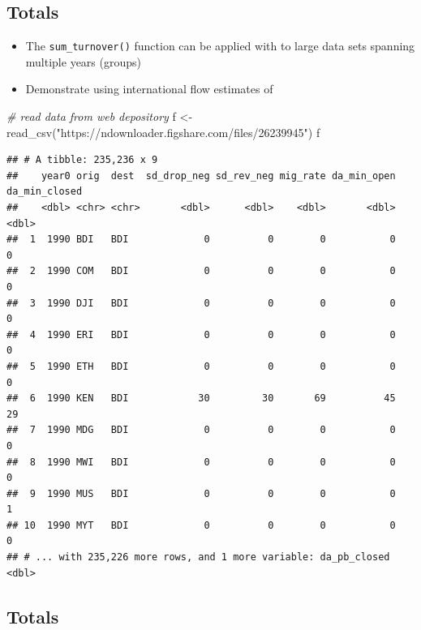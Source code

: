 \documentclass[
]{book}
\newenvironment{Shaded}{\begin{snugshade}}{\end{snugshade}}
\newcommand{\CommentTok}[1]{\textcolor[rgb]{0.56,0.35,0.01}{\textit{#1}}}
\newcommand{\FunctionTok}[1]{\textcolor[rgb]{0.00,0.00,0.00}{#1}}
\newcommand{\NormalTok}[1]{#1}
\newcommand{\OtherTok}[1]{\textcolor[rgb]{0.56,0.35,0.01}{#1}}
\newcommand{\StringTok}[1]{\textcolor[rgb]{0.31,0.60,0.02}{#1}}
\providecommand{\tightlist}{%
  \setlength{\itemsep}{0pt}\setlength{\parskip}{0pt}}
\begin{document}
\hypertarget{totals-2}{%
\subsection{Totals}\label{totals-2}}

\begin{itemize}
\tightlist
\item
  The \texttt{sum\_turnover()} function can be applied with to large data sets spanning multiple years (groups)
\item
  Demonstrate using international flow estimates of \citet{Abel2019}
\end{itemize}

\begin{Shaded}
\begin{Highlighting}[]
\CommentTok{\# read data from web depository}
\NormalTok{f }\OtherTok{\textless{}{-}} \FunctionTok{read\_csv}\NormalTok{(}\StringTok{"https://ndownloader.figshare.com/files/26239945"}\NormalTok{)}
\NormalTok{f}
\end{Highlighting}
\end{Shaded}

\begin{verbatim}
## # A tibble: 235,236 x 9
##    year0 orig  dest  sd_drop_neg sd_rev_neg mig_rate da_min_open da_min_closed
##    <dbl> <chr> <chr>       <dbl>      <dbl>    <dbl>       <dbl>         <dbl>
##  1  1990 BDI   BDI             0          0        0           0             0
##  2  1990 COM   BDI             0          0        0           0             0
##  3  1990 DJI   BDI             0          0        0           0             0
##  4  1990 ERI   BDI             0          0        0           0             0
##  5  1990 ETH   BDI             0          0        0           0             0
##  6  1990 KEN   BDI            30         30       69          45            29
##  7  1990 MDG   BDI             0          0        0           0             0
##  8  1990 MWI   BDI             0          0        0           0             0
##  9  1990 MUS   BDI             0          0        0           0             1
## 10  1990 MYT   BDI             0          0        0           0             0
## # ... with 235,226 more rows, and 1 more variable: da_pb_closed <dbl>
\end{verbatim}

\hypertarget{totals-3}{%
\subsection{Totals}\label{totals-3}}
\end{document}
